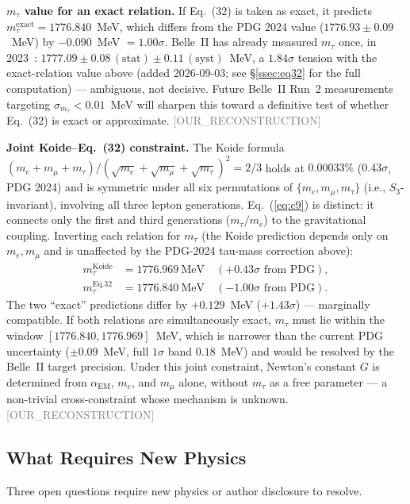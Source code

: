 \documentclass[twocolumn,prd,amsmath,amssymb,floatfix]{revtex4-2}
\newcommand{\reconstruction}{\textcolor{gray}{\small[OUR\_RECONSTRUCTION]}}
\begin{document}
\textbf{$m_\tau$ value for an exact relation.}
If Eq.~(32) is taken as exact, it predicts
$m_\tau^\mathrm{exact} = 1776.840$~MeV,
which differs from the PDG 2024 value ($1776.93 \pm 0.09$~MeV) by
$-0.090$~MeV $= 1.00\sigma$.
Belle~II has already measured $m_\tau$ once, in 2023~\cite{belleii2023taumass}:
$1777.09 \pm 0.08\,\mathrm{(stat)} \pm 0.11\,\mathrm{(syst)}$~MeV, a
$1.84\sigma$ tension with the exact-relation value above (added 2026-09-03;
see \S\ref{ssec:eq32} for the full computation) --- ambiguous, not
decisive. Future Belle~II Run~2 measurements targeting
$\sigma_{m_\tau} < 0.01$~MeV will sharpen this toward a definitive test of
whether Eq.~(32) is exact or approximate.
\reconstruction

\textbf{Joint Koide--Eq.~(32) constraint.}
The Koide formula
$(m_e + m_\mu + m_\tau)/(\sqrt{m_e}+\sqrt{m_\mu}+\sqrt{m_\tau})^2 = 2/3$
holds at $0.00033\%$ ($0.43\sigma$, PDG 2024) and is symmetric under all six
permutations of $\{m_e, m_\mu, m_\tau\}$ (i.e., $S_3$-invariant), involving
all three lepton generations.
Eq.~(\ref{eq:c9}) is distinct: it connects only the first and third
generations ($m_\tau/m_e$) to the gravitational coupling.
Inverting each relation for $m_\tau$ (the Koide prediction depends only on
$m_e,m_\mu$ and is unaffected by the PDG-2024 tau-mass correction above):
\begin{align}
  m_\tau^\mathrm{Koide} &= 1776.969~\mathrm{MeV} \quad (+0.43\sigma\text{ from PDG}) ,\\
  m_\tau^\mathrm{Eq.32} &= 1776.840~\mathrm{MeV} \quad (-1.00\sigma\text{ from PDG}) .
\end{align}
The two ``exact'' predictions differ by $+0.129$~MeV ($+1.43\sigma$) ---
marginally compatible.  If both relations are simultaneously exact,
$m_\tau$ must lie within the window $[1776.840, 1776.969]$~MeV, which is
narrower than the current PDG uncertainty ($\pm 0.09$~MeV, full $1\sigma$
band $0.18$~MeV) and would be resolved by the Belle~II target precision.
Under this joint constraint, Newton's constant $G$ is determined from
$\alpha_\mathrm{EM}$, $m_e$, and $m_\mu$ alone, without $m_\tau$ as a free
parameter --- a non-trivial cross-constraint whose mechanism is unknown.
\reconstruction

\subsection{What Requires New Physics}

Three open questions require new physics or author disclosure to resolve.
\end{document}
